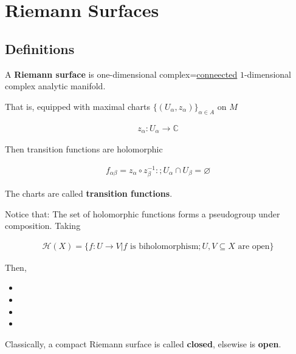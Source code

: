 \documentclass[Total.tex]{subfiles}
\begin{document}
	\chapter{Riemann Surfaces}
		\section{Definitions}
		
			\begin{Def}
				A \textbf{Riemann surface} is one-dimensional complex=\underline{conneected} $1$-dimensional complex analytic manifold.
				
				That is, equipped with maximal charts $\{(U_\alpha,z_\alpha)\}_{\alpha\in A}$ on $M$ 
				
				\begin{gather*}
					z_\alpha:U_\alpha\rightarrow \mathbb{C}
				\end{gather*}
				
				Then transition functions are holomorphic
				
				\begin{gather*}
					f_{\alpha\beta}=z_\alpha\circ z_\beta^{-1}:;U_\alpha\cap U_\beta=\varnothing
				\end{gather*}
				
				The charts are called \textbf{transition functions}.
			\end{Def}
			
			Notice that: The set of holomorphic functions forms a pseudogroup under composition. Taking
			
			\begin{gather*}
				\mathcal{H}(X)=\{f:U\rightarrow V|f\mbox{ is biholomorphism};U,V\subseteq X\mbox{ are open}\}
			\end{gather*}
			
			Then,
			
			\begin{itemize}
				\item 
				
				\item 
				
				\item 
				
				\item 
			\end{itemize}
			
			\begin{Def}
				Classically, a compact Riemann surface is called \textbf{closed}, elsewise is \textbf{open}.
			\end{Def}
			
\end{document}
